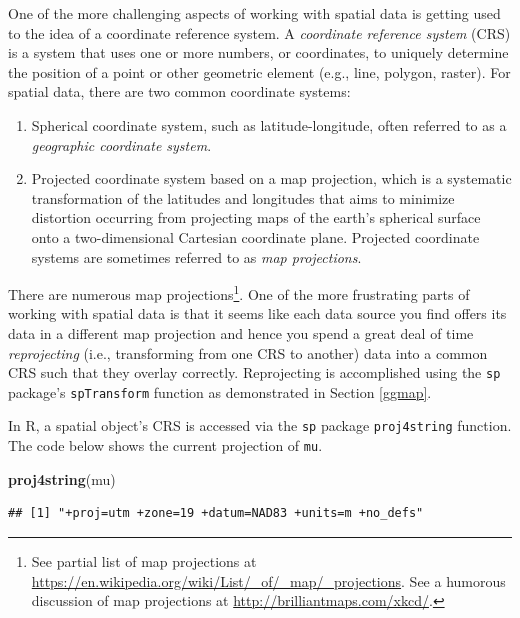 \documentclass[
]{krantz}
\newenvironment{Shaded}{\begin{snugshade}}{\end{snugshade}}
\newcommand{\KeywordTok}[1]{\textcolor[rgb]{0.13,0.29,0.53}{\textbf{#1}}}
\newcommand{\NormalTok}[1]{#1}
\providecommand{\tightlist}{%
  \setlength{\itemsep}{0pt}\setlength{\parskip}{0pt}}
\begin{document}
One of the more challenging aspects of working with spatial data is getting used to the idea of a coordinate reference system. A \emph{coordinate reference system} (CRS) is a system that uses one or more numbers, or coordinates, to uniquely determine the position of a point or other geometric element (e.g., line, polygon, raster). For spatial data, there are two common coordinate systems:

\begin{enumerate}
\def\labelenumi{\arabic{enumi}.}
\tightlist
\item
  Spherical coordinate system, such as latitude-longitude, often referred to as a \emph{geographic coordinate system}.
\item
  Projected coordinate system based on a map projection, which is a systematic transformation of the latitudes and longitudes that aims to minimize distortion occurring from projecting maps of the earth's spherical surface onto a two-dimensional Cartesian coordinate plane. Projected coordinate systems are sometimes referred to as \emph{map projections}.
\end{enumerate}

There are numerous map projections\footnote{See partial list of map projections at \url{https://en.wikipedia.org/wiki/List/_of/_map/_projections}. See a humorous discussion of map projections at \url{http://brilliantmaps.com/xkcd/}.}. One of the more frustrating parts of working with spatial data is that it seems like each data source you find offers its data in a different map projection and hence you spend a great deal of time \emph{reprojecting} (i.e., transforming from one CRS to another) data into a common CRS such that they overlay correctly. Reprojecting is accomplished using the \texttt{sp} package's \texttt{spTransform} function as demonstrated in Section \ref{ggmap}.

In R, a spatial object's CRS is accessed via the \texttt{sp} package \texttt{proj4string} function. The code below shows the current projection of \texttt{mu}.

\begin{Shaded}
\begin{Highlighting}[]
\KeywordTok{proj4string}\NormalTok{(mu)}
\end{Highlighting}
\end{Shaded}

\begin{verbatim}
## [1] "+proj=utm +zone=19 +datum=NAD83 +units=m +no_defs"
\end{verbatim}
\end{document}
